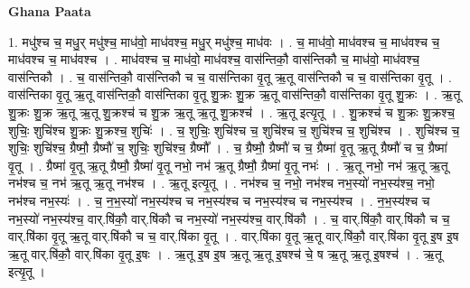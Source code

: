 \documentclass[17pt]{extarticle}
\begin{document}
\textbf{Ghana Paata } \newline

1. मधु॑श्च च॒ मधु॒र् मधु॑श्च॒ माध॑वो॒ माध॑वश्च॒ मधु॒र् मधु॑श्च॒ माध॑वः । . च॒ माध॑वो॒ माध॑वश्च च॒ माध॑वश्च च॒ माध॑वश्च च॒ माध॑वश्च । . माध॑वश्च च॒ माध॑वो॒ माध॑वश्च॒ वास॑न्तिकौ॒ वास॑न्तिकौ च॒ माध॑वो॒ माध॑वश्च॒ वास॑न्तिकौ । . च॒ वास॑न्तिकौ॒ वास॑न्तिकौ च च॒ वास॑न्तिका वृ॒तू ऋ॒तू वास॑न्तिकौ च च॒ वास॑न्तिका वृ॒तू । . वास॑न्तिका वृ॒तू ऋ॒तू वास॑न्तिकौ॒ वास॑न्तिका वृ॒तू शु॒क्रः शु॒क्र ऋ॒तू वास॑न्तिकौ॒ वास॑न्तिका वृ॒तू शु॒क्रः । . ऋ॒तू शु॒क्रः शु॒क्र ऋ॒तू ऋ॒तू शु॒क्रश्च॑ च शु॒क्र ऋ॒तू ऋ॒तू शु॒क्रश्च॑ । . ऋ॒तू इत्यृ॒तू । . शु॒क्रश्च॑ च शु॒क्रः शु॒क्रश्च॒ शुचिः॒ शुचि॑श्च शु॒क्रः शु॒क्रश्च॒ शुचिः॑ । . च॒ शुचिः॒ शुचि॑श्च च॒ शुचि॑श्च च॒ शुचि॑श्च च॒ शुचि॑श्च । . शुचि॑श्च च॒ शुचिः॒ शुचि॑श्च॒ ग्रैष्मौ॒ ग्रैष्मौ॑ च॒ शुचिः॒ शुचि॑श्च॒ ग्रैष्मौ᳚ । . च॒ ग्रैष्मौ॒ ग्रैष्मौ॑ च च॒ ग्रैष्मा॑ वृ॒तू ऋ॒तू ग्रैष्मौ॑ च च॒ ग्रैष्मा॑ वृ॒तू । . ग्रैष्मा॑ वृ॒तू ऋ॒तू ग्रैष्मौ॒ ग्रैष्मा॑ वृ॒तू नभो॒ नभ॑ ऋ॒तू ग्रैष्मौ॒ ग्रैष्मा॑ वृ॒तू नभः॑ । . ऋ॒तू नभो॒ नभ॑ ऋ॒तू ऋ॒तू नभ॑श्च च॒ नभ॑ ऋ॒तू ऋ॒तू नभ॑श्च । . ऋ॒तू इत्यृ॒तू । . नभ॑श्च च॒ नभो॒ नभ॑श्च नभ॒स्यो॑ नभ॒स्य॑श्च॒ नभो॒ नभ॑श्च नभ॒स्यः॑ । . च॒ न॒भ॒स्यो॑ नभ॒स्य॑श्च च नभ॒स्य॑श्च च नभ॒स्य॑श्च च नभ॒स्य॑श्च । . न॒भ॒स्य॑श्च च नभ॒स्यो॑ नभ॒स्य॑श्च॒ वार्.षि॑कौ॒ वार्.षि॑कौ च नभ॒स्यो॑ नभ॒स्य॑श्च॒ वार्.षि॑कौ । . च॒ वार्.षि॑कौ॒ वार्.षि॑कौ च च॒ वार्.षि॑का वृ॒तू ऋ॒तू वार्.षि॑कौ च च॒ वार्.षि॑का वृ॒तू । . वार्.षि॑का वृ॒तू ऋ॒तू वार्.षि॑कौ॒ वार्.षि॑का वृ॒तू इ॒ष इ॒ष ऋ॒तू वार्.षि॑कौ॒ वार्.षि॑का वृ॒तू इ॒षः । . ऋ॒तू इ॒ष इ॒ष ऋ॒तू ऋ॒तू इ॒षश्च॑ चे॒ ष ऋ॒तू ऋ॒तू इ॒षश्च॑ । . ऋ॒तू इत्यृ॒तू । \newline
\end{document}
